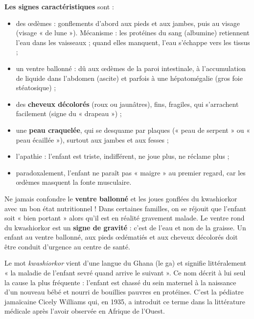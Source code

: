 \documentclass[11pt]{article}
\newcommand{\cle}[1]{{\popxbold\color{popdark}#1}}
\begin{document}
\textbf{Les signes caractéristiques} sont :
\begin{itemize}
\item des \cle{œdèmes} : gonflements d'abord aux pieds et aux jambes, puis au visage (visage « de lune »). Mécanisme : les protéines du sang (albumine) retiennent l'eau dans les vaisseaux ; quand elles manquent, l'eau s'échappe vers les tissus ;
\item un \cle{ventre ballonné} : dû aux œdèmes de la paroi intestinale, à l'accumulation de liquide dans l'abdomen (ascite) et parfois à une hépatomégalie (gros foie stéatosique) ;
\item des \textbf{cheveux décolorés} (roux ou jaunâtres), fins, fragiles, qui s'arrachent facilement (signe du « drapeau ») ;
\item une \textbf{peau craquelée}, qui se desquame par plaques (« peau de serpent » ou « peau écaillée »), surtout aux jambes et aux fesses ;
\item l'\cle{apathie} : l'enfant est triste, indifférent, ne joue plus, ne réclame plus ;
\item paradoxalement, l'enfant ne paraît pas « maigre » au premier regard, car les œdèmes masquent la fonte musculaire.
\end{itemize}

\begin{attention}
Ne jamais confondre le \textbf{ventre ballonné} et les joues gonflées du kwashiorkor avec un bon état nutritionnel ! Dans certaines familles, on se réjouit que l'enfant soit « bien portant » alors qu'il est en réalité gravement malade. Le ventre rond du kwashiorkor est un \textbf{signe de gravité} : c'est de l'eau et non de la graisse. Un enfant au ventre ballonné, aux pieds œdématiés et aux cheveux décolorés doit être conduit d'urgence au centre de santé.
\end{attention}

\begin{savaistu}
Le mot \emph{kwashiorkor} vient d'une langue du Ghana (le ga) et signifie littéralement « la maladie de l'enfant sevré quand arrive le suivant ». Ce nom décrit à lui seul la cause la plus fréquente : l'enfant est chassé du sein maternel à la naissance d'un nouveau bébé et nourri de bouillies pauvres en protéines. C'est la pédiatre jamaïcaine Cicely Williams qui, en 1935, a introduit ce terme dans la littérature médicale après l'avoir observée en Afrique de l'Ouest.
\end{savaistu}
\end{document}
